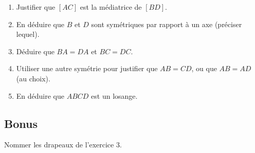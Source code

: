 \documentclass[14 pt]{extarticle}
\theoremstyle{plain}
\begin{document}
\begin{enumerate}
\item Justifier que $[AC]$ est la médiatrice de $[BD]$. 
\item En déduire que $B$ et $D$ sont symétriques par rapport à un axe (préciser lequel). 
\item Déduire que $BA=DA$ et $BC=DC$.
\item Utiliser une autre symétrie pour justifier que $AB=CD$, ou que $AB=AD$ (au choix).
\item En déduire que $ABCD$ est un losange. 
\end{enumerate}
\subsection*{Bonus}
Nommer les drapeaux de l'exercice 3.
\newpage

 	
\end{document}
